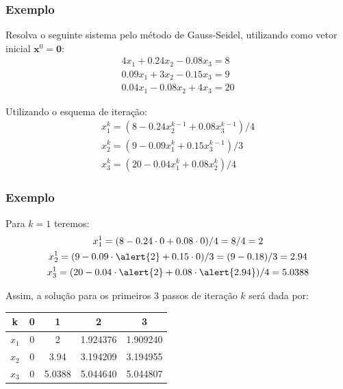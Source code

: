 \documentclass{beamer}
\theoremstyle{mystyle}
\begin{document}
\begin{frame}
	\frametitle{Exemplo}
	Resolva o seguinte sistema pelo método de Gauss-Seidel, utilizando como vetor inicial $ \mathbf{x}^{0} = \mathbf{0}$:
	\begin{gather*}
		4 x_1 + 0.24 x_2 - 0.08 x_3 = 8 \\
		0.09 x_1 + 3 x_2 - 0.15 x_3 = 9 \\
		0.04 x_1 - 0.08 x_2 + 4 x_3 = 20
	\end{gather*} 
	\pause 
	
	Utilizando o esquema de iteração:
	\begin{gather*}
		x_1^{k} = ( 8 - 0.24 x_2^{k-1} + 0.08 x_3^{k-1} ) / 4\\
		x_2^{k} = ( 9 - 0.09 x_1^{k} + 0.15 x_3^{k-1} ) / 3\\
		x_3^{k} = ( 20 - 0.04 x_1^{k} + 0.08 x_2^{k} ) / 4
	\end{gather*}
\end{frame}

\begin{frame}
	\frametitle{Exemplo}
	Para $ k=1 $ teremos:
	\begin{gather*}
		x_1^{1} = ( 8 - 0.24 \cdot 0 + 0.08 \cdot 0 ) / 4 = 8/4 = 2\\
		x_2^{1} = ( 9 - 0.09 \cdot \alert{2} + 0.15 \cdot 0 ) / 3 = (9 - 0.18)/3 = 2.94\\
		x_3^{1} = ( 20 - 0.04 \cdot \alert{2} + 0.08\cdot \alert{2.94} ) / 4 = 5.0388
	\end{gather*}
	
	Assim, a solução para os primeiros 3 passos de iteração $ k $ será dada por:
	\begin{table}
		\centering
		\begin{tabular}{c|c|c|c|c}
			k & 0 & 1 & 2 & 3 \\
			\hline
			\hline
			$ x_1 $ & 0 & 2 & 1.924376 & 1.909240 \\
			$ x_2 $ & 0 & 3.94 & 3.194209 & 3.194955 \\
			$ x_3 $ & 0	& 5.0388 & 5.044640 & 5.044807
		\end{tabular}
	\end{table}
\end{frame}
\end{document}
